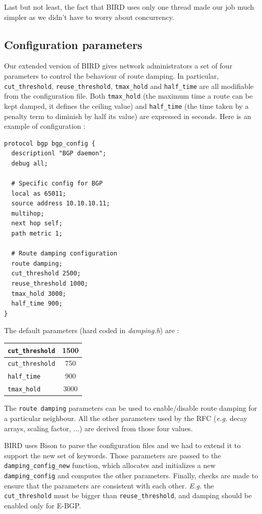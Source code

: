\documentclass[a4paper,english]{IEEEtran}
\begin{document}
Last but not least, the fact that BIRD uses only one thread made our job much simpler as we didn't have to worry about concurrency.

\subsection{Configuration parameters}

Our extended version of BIRD gives network administrators a set of four parameters to control the behaviour of route damping.
In particular, {\tt\small cut\_threshold}, {\tt\small reuse\_threshold}, {\tt\small tmax\_hold} and {\tt\small half\_time} are all modifiable
from the configuration file.
Both {\tt\small tmax\_hold} (the maximum time a route can be kept damped, it defines the ceiling value)  and {\tt\small half\_time} (the time taken by a penalty term to diminish by half its value) are expressed in seconds.
Here is an example of configuration :

\begin{verbatim}
protocol bgp bgp_config {
  descriptionl "BGP daemon";
  debug all;

  # Specific config for BGP
  local as 65011;
  source address 10.10.10.11;
  multihop;
  next hop self;
  path metric 1;
 
  # Route damping configuration
  route damping;
  cut_threshold 2500;
  reuse_threshold 1000;
  tmax_hold 3000;
  half_time 900;
}
\end{verbatim}

The default parameters (hard coded in \textsl{damping.h}) are :

\begin{center}
\begin{tabular}{|l|c|}
\hline
\texttt{\small cut\_threshold} & 1500 \\
\hline
\texttt{\small cut\_threshold} & 750 \\
\hline
\texttt{\small half\_time} & 900 \\
\hline
\texttt{\small tmax\_hold} & 3000 \\
\hline
\end{tabular}
\end{center}

The {\tt\small route damping} parameters can be used to enable/disable route damping for a particular neighbour.
All the other parameters used by the RFC (\textit{e.g.} decay arrays, scaling factor, ...) are derived from
those four values.

BIRD uses Bison to parse the configuration files and we had to extend it to support the new set of keywords.
Those parameters are passed to the {\tt\small damping\_config\_new} function, which allocates and initializes a new {\tt\small damping\_config} and computes the 
other parameters.
Finally, checks are made to ensure that the parameters are consistent with each other.
\textit{E.g.} the \texttt{\small cut\_threshold} must be bigger than \texttt{\small reuse\_threshold}, and damping should be enabled only for E-BGP.
\end{document}
